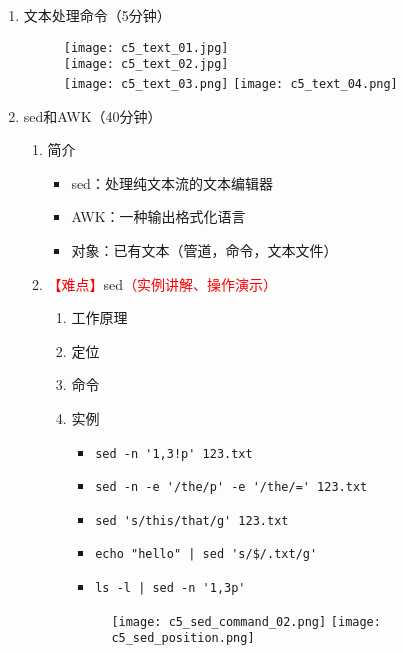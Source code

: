 \documentclass{TIJMUjiaoanLL}
\begin{document}
\begin{enumerate}
\otherTail
\newpage
\otherHeader


  \item 文本处理命令（5分钟）
	\vspace*{-10pt}
	\begin{figure}[h]
	  \centering
	  \texttt{[image: c5\_text\_01.jpg]}\\
	  \texttt{[image: c5\_text\_02.jpg]}\\
	  \texttt{[image: c5\_text\_03.png]}
	  \texttt{[image: c5\_text\_04.png]}
	\end{figure}
	\vspace*{-10pt}

  \item sed和AWK（40分钟）
    \begin{enumerate}
      \item 简介
	\begin{itemize}
	  \item sed：处理纯文本流的文本编辑器
	  \item AWK：一种输出格式化语言
	  \item 对象：已有文本（管道，命令，文本文件）
	\end{itemize}
      \item \textcolor{red}{【难点】}sed\textcolor{red}{（实例讲解、操作演示）}
	\begin{enumerate}
	  \item 工作原理
	  \item 定位
	  \item 命令

\otherTail
\newpage
\otherHeader

	  \item 实例
	    \begin{itemize}
              \item \verb|sed -n '1,3!p' 123.txt|
	      \item \verb|sed -n -e '/the/p' -e '/the/=' 123.txt|
              \item \verb|sed 's/this/that/g' 123.txt|
	      \item \verb=echo "hello" | sed 's/$/.txt/g'=
              \item \verb=ls -l | sed -n '1,3p'=
	    \end{itemize}
	\vspace*{-10pt}
	\begin{figure}[h]
	  \centering
	  \hspace{1cm}
	  \texttt{[image: c5\_sed\_command\_02.png]}
	  \texttt{[image: c5\_sed\_position.png]}
	\end{figure}
	\vspace*{-10pt}
	\end{enumerate}



\end{enumerate}
\end{enumerate}
\end{document}

